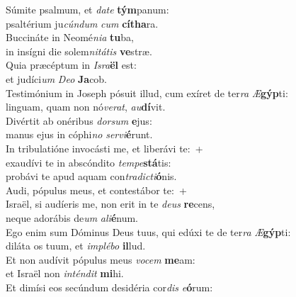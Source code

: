 \evenverse Súmite psalmum, et \textit{da}\textit{te} \textbf{tým}panum:~\*\\
\evenverse psaltérium ju\textit{cún}\textit{dum} \textit{cum} \textbf{cí}\textbf{tha}ra.\\
\oddverse Buccináte in Neomé\textit{ni}\textit{a} \textbf{tu}ba,~\*\\
\oddverse in insígni die solem\textit{ni}\textit{tá}\textit{tis} \textbf{ve}stræ.\\
\evenverse Quia præcéptum in \textit{Is}\textit{ra}\textbf{ël} est:~\*\\
\evenverse et judíci\textit{um} \textit{De}\textit{o} \textbf{Ja}cob.\\
\oddverse Testimónium in Joseph pósuit illud, cum exíret de ter\textit{ra} \textit{Æ}\textbf{gýp}ti:~\*\\
\oddverse linguam, quam non nó\textit{ve}\textit{rat}, \textit{au}\textbf{dí}vit.\\
\evenverse Divértit ab onéribus \textit{dor}\textit{sum} \textbf{e}jus:~\*\\
\evenverse manus ejus in cóphi\textit{no} \textit{ser}\textit{vi}\textbf{é}runt.\\
\oddverse In tribulatióne invocásti me, et liberávi te:~+\\
\oddverse  exaudívi te in abscóndito \textit{tem}\textit{pe}\textbf{stá}tis:~\*\\
\oddverse probávi te apud aquam con\textit{tra}\textit{di}\textit{cti}\textbf{ó}nis.\\
\evenverse Audi, pópulus meus, et contestábor te:~+\\
\evenverse  Israël, si audíeris me, non erit in te \textit{de}\textit{us} \textbf{re}cens,~\*\\
\evenverse neque adorábis de\textit{um} \textit{a}\textit{li}\textbf{é}num.\\
\oddverse Ego enim sum Dóminus Deus tuus, qui edúxi te de ter\textit{ra} \textit{Æ}\textbf{gýp}ti:~\*\\
\oddverse diláta os tuum, et \textit{im}\textit{plé}\textit{bo} \textbf{il}lud.\\
\evenverse Et non audívit pópulus meus \textit{vo}\textit{cem} \textbf{me}am:~\*\\
\evenverse et Israël non \textit{in}\textit{tén}\textit{dit} \textbf{mi}hi.\\
\oddverse Et dimísi eos secúndum desidéria cor\textit{dis} \textit{e}\textbf{ó}rum:~\*\\
